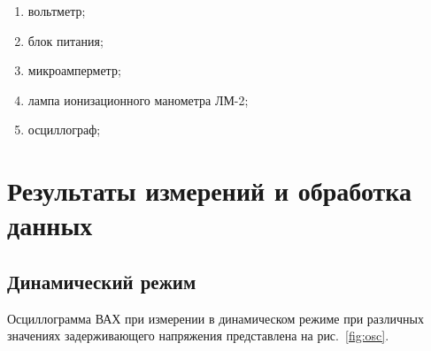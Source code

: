 \documentclass[a4paper, 12pt]{article}
\begin{document}
\begin{enumerate}
    \item вольтметр;
    \item блок питания;
    \item микроамперметр;
    \item лампа ионизационного манометра ЛМ-2;
    \item осциллограф;
\end{enumerate}

\section{Результаты измерений и обработка данных}

\subsection{Динамический режим}

Осциллограмма ВАХ при измерении в динамическом режиме при различных значениях задерживающего напряжения представлена на рис.~\ref{fig:osc}.
\end{document}
